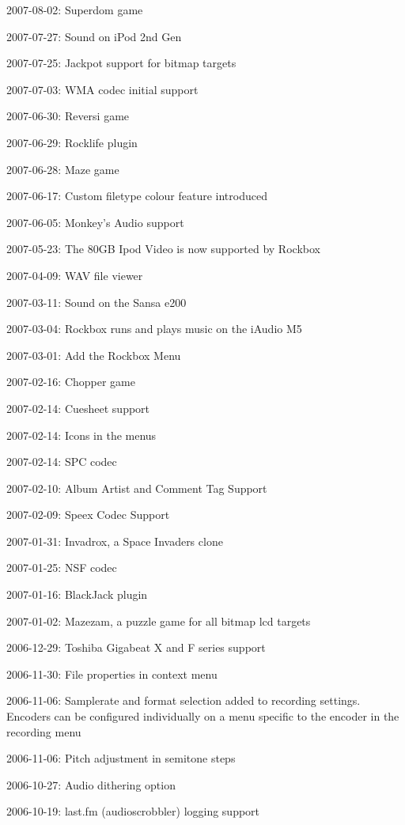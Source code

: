 \begin{changelog}
\item 2007-08-02: Superdom game
\item 2007-07-27: Sound on iPod 2nd Gen
\item 2007-07-25: Jackpot support for bitmap targets
\item 2007-07-03: WMA codec initial support
\item 2007-06-30: Reversi game
\item 2007-06-29: Rocklife plugin
\item 2007-06-28: Maze game
\item 2007-06-17: Custom filetype colour feature introduced 
\item 2007-06-05: Monkey's Audio support
\item 2007-05-23: The 80GB Ipod Video is now supported by Rockbox
\item 2007-04-09: WAV file viewer
\item 2007-03-11: Sound on the Sansa e200
\item 2007-03-04: Rockbox runs and plays music on the iAudio M5
\item 2007-03-01: Add the Rockbox Menu
\item 2007-02-16: Chopper game
\item 2007-02-14: Cuesheet support
\item 2007-02-14: Icons in the menus
\item 2007-02-14: SPC codec
\item 2007-02-10: Album Artist and Comment Tag Support
\item 2007-02-09: Speex Codec Support
\item 2007-01-31: Invadrox, a Space Invaders clone
\item 2007-01-25: NSF codec
\item 2007-01-16: BlackJack plugin
\item 2007-01-02: Mazezam, a puzzle game for all bitmap lcd targets
\item 2006-12-29: Toshiba Gigabeat X and F series support
\item 2006-11-30: File properties in context menu
\item 2006-11-06: Samplerate and format selection added to recording
  settings. Encoders can be configured individually on a menu specific
  to the encoder in the recording menu
\item 2006-11-06: Pitch adjustment in semitone steps
\item 2006-10-27: Audio dithering option
\item 2006-10-19: last.fm (audioscrobbler) logging support

\end{changelog}
